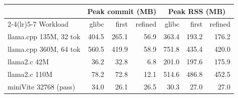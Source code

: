 \begin{tabular}{lrrrrrr}
\toprule
 & \multicolumn{3}{c}{Peak commit (MB)} & \multicolumn{3}{c}{Peak RSS (MB)} \\
\cmidrule(lr){2-4}\cmidrule(lr){5-7}
Workload & glibc & first & refined & glibc & first & refined \\
\midrule
llama.cpp 135M, 32 tok & 404.5 & 265.1 & 56.9 & 363.4 & 193.2 & 176.2 \\
llama.cpp 360M, 64 tok & 560.5 & 419.9 & 58.9 & 751.8 & 435.4 & 420.0 \\
llama2.c 42M & 36.2 & 32.8 & 6.8 & 201.0 & 197.6 & 175.9 \\
llama2.c 110M & 78.2 & 72.8 & 12.1 & 514.6 & 486.8 & 452.5 \\
miniVite 32768 (pass) & 34.0 & 26.1 & 26.5 & 30.3 & 27.0 & 27.0 \\
\bottomrule
\end{tabular}
